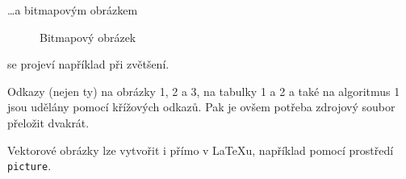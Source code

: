 \documentclass[11pt,a4paper]{article}
\begin{document}
	\noindent \dots a bitmapovým obrázkem
	
	\begin{figure}[h]
		\begin{center}
			\caption{Bitmapový obrázek}
		\end{center}		
	\end{figure}

	\noindent se projeví například při zvětšení.
	
	Odkazy (nejen ty) na obrázky 1, 2 a 3, na tabulky 1 a 2 a také na algoritmus 1 jsou udělány pomocí křížových odkazů. Pak je ovšem potřeba zdrojový soubor přeložit dvakrát.
	
	Vektorové obrázky lze vytvořit i přímo v \LaTeX u, například pomocí prostředí \texttt{picture}.
\end{document}
